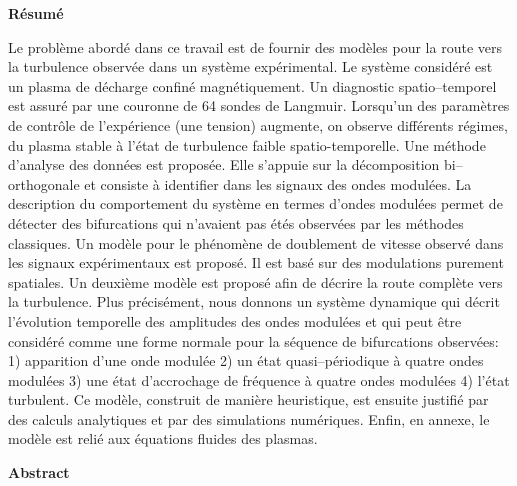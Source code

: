 \pagestyle{empty}
\textheight 250mm
\textwidth      142mm
\evensidemargin -6mm
\oddsidemargin  -6mm



   


\begin{center}
{\large \bf R\'esum\'e}
\end{center}

Le probl\`eme abord\'e dans ce travail est de fournir des mod\`eles
pour la route vers la turbulence observ\'ee dans un syst\`eme
exp\'erimental. Le syst\`eme consid\'er\'e est un plasma de d\'echarge
confin\'e magn\'etiquement. Un diagnostic spatio--temporel est
assur\'e par une couronne de 64 sondes de Langmuir. Lorsqu'un des
param\`etres de contr\^ole de l'exp\'erience (une tension) augmente, on
observe diff\'erents r\'egimes, du  plasma stable \`a l'\'etat
de turbulence faible spatio-temporelle. Une m\'ethode d'analyse des
donn\'ees est propos\'ee. Elle s'appuie sur la d\'ecomposition
bi--orthogonale et consiste \`a identifier dans les
signaux des ondes modul\'ees. La description du comportement du
syst\`eme en termes 
d'ondes modul\'ees permet de d\'etecter des bifurcations qui n'avaient
pas \'et\'es observ\'ees par les m\'ethodes classiques. Un mod\`ele
pour le ph\'enom\`ene de doublement de vitesse observ\'e dans les
signaux exp\'erimentaux est propos\'e. Il est bas\'e sur des
modulations purement spatiales.
Un deuxi\`eme mod\`ele est propos\'e afin de
d\'ecrire la route compl\`ete vers la turbulence. Plus
pr\'ecis\'ement, nous donnons un syst\`eme dynamique qui d\'ecrit
l'\'evolution temporelle des amplitudes des ondes modul\'ees et qui
peut \^etre consid\'er\'e comme une forme normale pour la s\'equence
de bifurcations observ\'ees: 1) apparition d'une onde modul\'ee 2) un
\'etat quasi--p\'eriodique \`a quatre ondes modul\'ees 3) une \'etat
d'accrochage de fr\'equence \`a quatre ondes modul\'ees 4) l'\'etat
turbulent.
Ce mod\`ele, construit de mani\`ere heuristique, est ensuite justifi\'e
par des calculs analytiques et par des simulations num\'eriques.
Enfin, en annexe, le mod\`ele est reli\'e aux \'equations fluides des
plasmas.


\vspace{5mm}
\begin{center}
{\large\bf Abstract}
\end{center}

